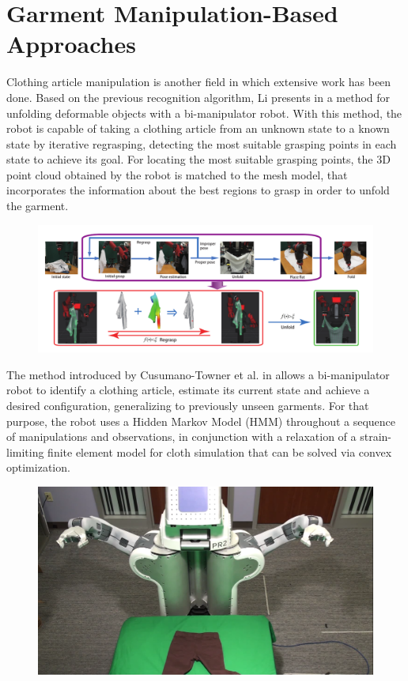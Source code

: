 \section{Garment Manipulation-Based Approaches}
\label{sota:garment_manipulation_based}
Clothing article manipulation is another field in which extensive work has been done. Based on the previous recognition algorithm, Li presents in \cite{Li2015ICRA} a method for unfolding deformable objects with a bi-manipulator robot. With this method, the robot is capable of taking a clothing article from an unknown state to a known state by iterative regrasping, detecting the most suitable grasping points in each state to achieve its goal. For locating the most suitable grasping points, the 3D point cloud obtained by the robot is matched to the mesh model, that incorporates the information about the best regions to grasp in order to unfold the garment.

\begin{figure}[thpb]
    \centering
    \includegraphics[width=\textwidth]{figures/SOTA_Li_2015.png}
    \caption{}
    \label{fig:SOTA_Li_2015}
\end{figure}

The method introduced by Cusumano-Towner et al. in \cite{Cusumano-Towner2011} allows a bi-manipulator robot to identify a clothing article, estimate its current state and achieve a desired configuration, generalizing to previously unseen garments. For that purpose, the robot uses a Hidden Markov Model (HMM) throughout a sequence of manipulations and observations, in conjunction with a relaxation of a strain-limiting finite element model for cloth simulation that can be solved via convex optimization.

\begin{figure}[thpb]
    \centering
    \includegraphics[width=\textwidth]{figures/SOTA_Cusumano_PR2.png}
    \caption{}
    \label{fig:SOTA_Cusumano_2011}
\end{figure}

